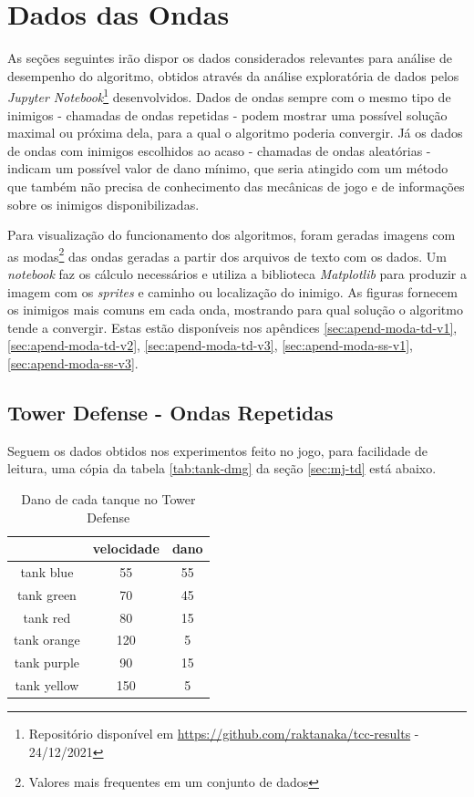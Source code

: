\section{Dados das Ondas}
\label{sec:a-ondas}

As seções seguintes irão dispor os dados considerados relevantes para análise de desempenho do algoritmo, obtidos através da análise exploratória de dados pelos \textit{Jupyter Notebook}\footnote{Repositório disponível em \url{https://github.com/raktanaka/tcc-results} - 24/12/2021} desenvolvidos. Dados de ondas sempre com o mesmo tipo de inimigos - chamadas de ondas repetidas - podem mostrar uma possível solução maximal ou próxima dela, para a qual o algoritmo poderia convergir. Já os dados de ondas com inimigos escolhidos ao acaso - chamadas de ondas aleatórias - indicam um possível valor de dano mínimo, que seria atingido com um método que também não precisa de conhecimento das mecânicas de jogo e de informações sobre os inimigos disponibilizadas.

Para visualização do funcionamento dos algoritmos, foram geradas imagens com as modas\footnote{Valores mais frequentes em um conjunto de dados} das ondas geradas a partir dos arquivos de texto com os dados. Um \textit{notebook} faz os cálculo necessários e utiliza a biblioteca \textit{Matplotlib} para produzir a imagem com os \textit{sprites} e caminho ou localização do inimigo. As figuras fornecem os inimigos mais comuns em cada onda, mostrando para qual solução o algoritmo tende a convergir. Estas estão disponíveis nos apêndices \ref{sec:apend-moda-td-v1}, \ref{sec:apend-moda-td-v2}, \ref{sec:apend-moda-td-v3}, \ref{sec:apend-moda-ss-v1}, \ref{sec:apend-moda-ss-v3}.

\subsection{Tower Defense - Ondas Repetidas}
\label{sec:uni-td}

Seguem os dados obtidos nos experimentos feito no jogo, para facilidade de leitura, uma cópia da tabela \ref{tab:tank-dmg} da seção \ref{sec:mj-td} está abaixo.

\begin{table}
\caption{Dano de cada tanque no Tower Defense}
\begin{tabular}{c|cc}
            & velocidade & dano   \\ \hline
tank blue   & 55    & 55         \\
tank green  & 70    & 45         \\
tank red    & 80    & 15          \\
tank orange & 120   & 5           \\
tank purple & 90    & 15          \\
tank yellow & 150   & 5           
\end{tabular}
\label{tab:tank-dmg3}
\end{table}

